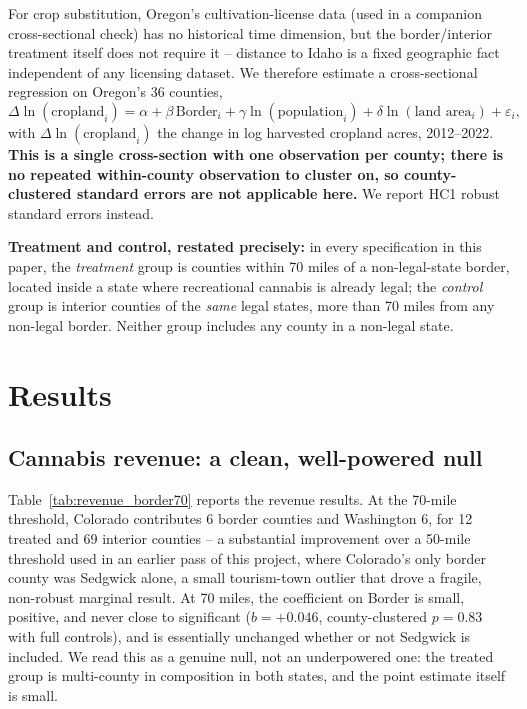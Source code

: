 ﻿\documentclass{article}
\begin{document}
For crop substitution, Oregon's cultivation-license data (used in a companion cross-sectional check) has
no historical time dimension, but the border/interior treatment itself does not require it -- distance to
Idaho is a fixed geographic fact independent of any licensing dataset. We therefore estimate a
cross-sectional regression on Oregon's 36 counties,
\[
\Delta \ln(\text{cropland}_i) = \alpha + \beta \, \text{Border}_i + \gamma \ln(\text{population}_i) +
\delta \ln(\text{land area}_i) + \varepsilon_i,
\]
with $\Delta\ln(\text{cropland}_i)$ the change in log harvested cropland acres, 2012--2022.
\textbf{This is a single cross-section with one observation per county; there is no repeated
within-county observation to cluster on, so county-clustered standard errors are not applicable here.} We
report HC1 robust standard errors instead.

\textbf{Treatment and control, restated precisely:} in every specification in this paper, the
\emph{treatment} group is counties within 70 miles of a non-legal-state border, located inside a state
where recreational cannabis is already legal; the \emph{control} group is interior counties of the
\emph{same} legal states, more than 70 miles from any non-legal border. Neither group includes any county
in a non-legal state.

\section{Results}
\label{sec:results}

\subsection{Cannabis revenue: a clean, well-powered null}

Table~\ref{tab:revenue_border70} reports the revenue results. At the 70-mile threshold, Colorado
contributes 6 border counties and Washington 6, for 12 treated and 69 interior counties -- a substantial
improvement over a 50-mile threshold used in an earlier pass of this project, where Colorado's only
border county was Sedgwick alone, a small tourism-town outlier that drove a fragile, non-robust marginal
result. At 70 miles, the coefficient on Border is small, positive, and never close to significant
($b=+0.046$, county-clustered $p=0.83$ with full controls), and is essentially unchanged whether or not
Sedgwick is included. We read this as a genuine null, not an underpowered one: the treated group is
multi-county in composition in both states, and the point estimate itself is small.
\end{document}
